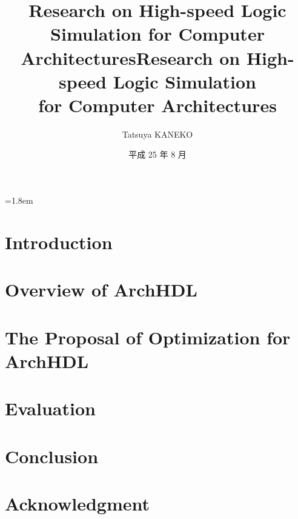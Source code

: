 \documentclass[12pt,openany,papersize,english]{jsbook}
\title{Research on High-speed Logic Simulation for Computer Architectures}
\affiliation{Department of Computer Science}
\title{Research on High-speed Logic Simulation \\ for Computer Architectures}
\author{Tatsuya KANEKO}
\date{平成 25 年 8 月}
\begin{document}
\maketitle
\parindent=1.8em
\frontmatter

\tableofcontents

\mainmatter

\frenchspacing
\sloppy

\chapter{Introduction}




% 

\chapter{Overview of ArchHDL}

\label{c:summary}



\chapter{The Proposal of Optimization for ArchHDL}

\label{c:method}



\chapter{Evaluation}

\label{c:evaluation}



\chapter{Conclusion}

\label{c:conclusion}



\backmatter

\nonfrenchspacing

\chapter{Acknowledgment}

\label{c:acknowledgment}



\label{c:relatedwork}


\end{document}
